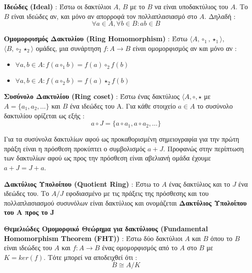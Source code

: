 \begin{definition}
\textbf{Ιδεώδες (Ideal)} : Έστω οι δακτύλιοι $A$, $B$ με το $B$ να είναι υποδακτύλιος του $Α$. Το $B$ είναι ιδεώδες αν, και μόνο αν απορροφά τον πολλαπλασιασμό στο $A$. Δηλαδή :
$$
\forall a \in A, \forall b \in B : ab \in B
$$
\end{definition}

\begin{definition}
\textbf{Ομομορφισμός Δακτυλίου (Ring Homomorphism)} : Έστω $\langle A, \circ_1, \star_1 \rangle$, $\langle B, \circ_2 \star_2 \rangle$ ομάδες, μια συνάρτηση $f : A \rightarrow B$ είναι ομομορφισμός αν και μόνο αν :
\begin{itemize}
    \item $\forall a, b \in A : f(a \circ_1 b) = f(a) \circ_2 f(b)$
    \item $\forall a, b \in A : f(a \circ_2 b) = f(a) \star_2 f(b)$
\end{itemize}
\end{definition}

\begin{definition}
\textbf{Συσύνολο Δακτυλίου (Ring coset)} : Έστω ένας δακτύλιος $\langle A, \circ, \star$ με $Α = \{a_1, a_2, \ldots \}$ και $B$ ένα ιδεώδες του Α. Για κάθε στοιχείο $a \in A$ το συσύνολο δακτυλίου ορίζεται ως εξής :
$$
a \circ J = \{a \circ a_1, a \circ a_2, \ldots\}
$$
\end{definition}

Για τα συσύνολα δακτυλίων αφού ως προκαθορισμένη σημειογραφία για την πρώτη πράξη είναι η πρόσθεση προκύπτει ο συμβολισμός $a + J$. Προφανώς στην περίπτωση των δακτυλίων αφού ως προς την πρόσθεση είναι αβελιανή ομάδα έχουμε $a + J = J + a$.

\begin{definition}
\textbf{Δακτύλιος Υπολοίπου (Quotient Ring)} : Έστω το $Α$ ένας δακτύλιος και το $J$ ένα ιδεώδες του. Το $A / J$ εφοδιασμένο με τις πράξεις της πρόσθεσης και του πολλαπλασιασμού συσυνόλων είναι δακτύλιος και ονομάζεται \textbf{Δακτύλιος Υπολοίπου του A προς το J}
\end{definition}

\begin{definition}
\textbf{Θεμελιώδες Ομομορφικό Θεώρημα για δακτύλιους (Fundamental Homomorphism Theorem (FHT))} : Έστω δύο δακτύλιοι $A$ και $B$ όπου το $B$ είναι ιδεώδες του $A$ και $f : A \rightarrow B$ ένας ομομορφισμός από το $A$ στο $B$ με $K = ker(f)$. Τότε μπορεί να αποδειχθεί ότι :
$$
Β \cong A / K
$$
\end{definition}

